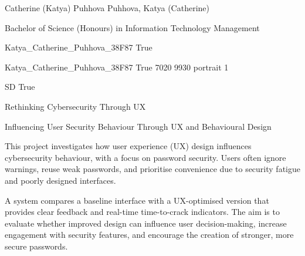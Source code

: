 
\begingroup{}\relax



\def\Key{Katya_Catherine_Puhhova_38F87}

{Catherine (Katya) Puhhova}
{Puhhova, Katya (Catherine)}

{Bachelor of Science (Honours) in Information Technology Management}

{Katya_Catherine_Puhhova_38F87}
{True}

{Katya_Catherine_Puhhova_38F87}
{True}
{7020}
{9930}
{portrait}
{1}

{SD}
{True}

{Rethinking Cybersecurity Through UX}

{Influencing User Security Behaviour Through UX and Behavioural Design}

{This project investigates how user experience (UX) design influences cybersecurity behaviour, with a focus on password security. Users often ignore warnings, reuse weak passwords, and prioritise convenience due to security fatigue and poorly designed interfaces.

A system compares a baseline interface with a UX-optimised version that provides clear feedback and real-time time-to-crack indicators. The aim is to evaluate whether improved design can influence user decision-making, increase engagement with security features, and encourage the creation of stronger, more secure passwords.}

